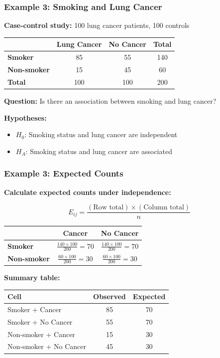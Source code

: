 \documentclass{beamer}
\begin{document}
\begin{frame}
\frametitle{Example 3: Smoking and Lung Cancer}
\textbf{Case-control study:} 100 lung cancer patients, 100 controls

\vspace{0.3cm}
\begin{center}
\begin{tabular}{l|cc|c}
& \textbf{Lung Cancer} & \textbf{No Cancer} & \textbf{Total} \\
\hline
\textbf{Smoker} & 85 & 55 & 140 \\
\textbf{Non-smoker} & 15 & 45 & 60 \\
\hline
\textbf{Total} & 100 & 100 & 200 \\
\end{tabular}
\end{center}

\vspace{0.5cm}
\textbf{Question:} Is there an association between smoking and lung cancer?

\vspace{0.3cm}
\textbf{Hypotheses:}
\begin{itemize}
\item $H_0$: Smoking status and lung cancer are independent
\item $H_A$: Smoking status and lung cancer are associated
\end{itemize}
\end{frame}

\begin{frame}
\frametitle{Example 3: Expected Counts}
\textbf{Calculate expected counts under independence:}

$$E_{ij} = \frac{(\text{Row total}) \times (\text{Column total})}{n}$$

\vspace{0.3cm}
\begin{center}
\begin{tabular}{l|cc}
& \textbf{Cancer} & \textbf{No Cancer} \\
\hline
\textbf{Smoker} & $\frac{140 \times 100}{200} = 70$ & $\frac{140 \times 100}{200} = 70$ \\
\textbf{Non-smoker} & $\frac{60 \times 100}{200} = 30$ & $\frac{60 \times 100}{200} = 30$ \\
\end{tabular}
\end{center}

\vspace{0.5cm}
\textbf{Summary table:}
\begin{center}
\begin{tabular}{lcc}
\toprule
Cell & Observed & Expected \\
\midrule
Smoker + Cancer & 85 & 70 \\
Smoker + No Cancer & 55 & 70 \\
Non-smoker + Cancer & 15 & 30 \\
Non-smoker + No Cancer & 45 & 30 \\
\bottomrule
\end{tabular}
\end{center}
\end{frame}
\end{document}
